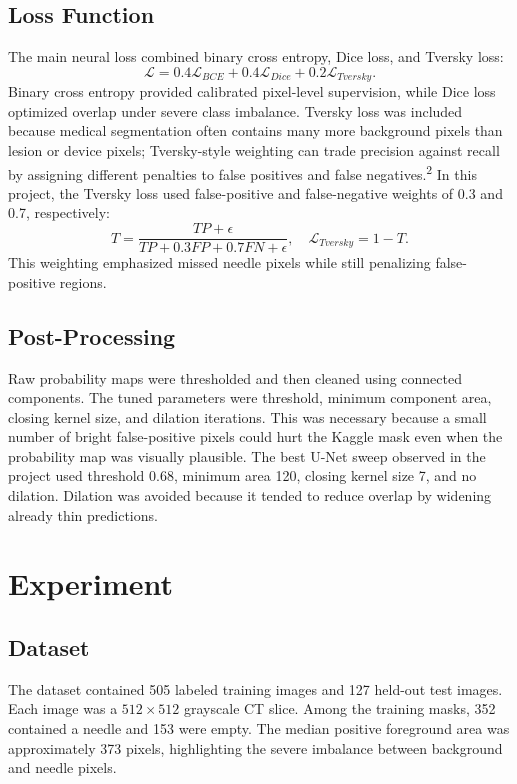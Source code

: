 \documentclass[10pt]{article}
\begin{document}
\subsection{Loss Function}
The main neural loss combined binary cross entropy, Dice loss, and Tversky loss:
\begin{equation}
\mathcal{L}=0.4\mathcal{L}_{BCE}+0.4\mathcal{L}_{Dice}+0.2\mathcal{L}_{Tversky}.
\end{equation}
Binary cross entropy provided calibrated pixel-level supervision, while Dice loss optimized overlap under severe class imbalance. Tversky loss was included because medical segmentation often contains many more background pixels than lesion or device pixels; Tversky-style weighting can trade precision against recall by assigning different penalties to false positives and false negatives.\textsuperscript{2} In this project, the Tversky loss used false-positive and false-negative weights of 0.3 and 0.7, respectively:
\begin{equation}
T = \frac{TP+\epsilon}{TP+0.3FP+0.7FN+\epsilon}, \quad
\mathcal{L}_{Tversky}=1-T.
\end{equation}
This weighting emphasized missed needle pixels while still penalizing false-positive regions.

\subsection{Post-Processing}
Raw probability maps were thresholded and then cleaned using connected components. The tuned parameters were threshold, minimum component area, closing kernel size, and dilation iterations. This was necessary because a small number of bright false-positive pixels could hurt the Kaggle mask even when the probability map was visually plausible. The best U-Net sweep observed in the project used threshold $0.68$, minimum area 120, closing kernel size 7, and no dilation. Dilation was avoided because it tended to reduce overlap by widening already thin predictions.

\section{Experiment}
\subsection{Dataset}
The dataset contained 505 labeled training images and 127 held-out test images. Each image was a $512 \times 512$ grayscale CT slice. Among the training masks, 352 contained a needle and 153 were empty. The median positive foreground area was approximately 373 pixels, highlighting the severe imbalance between background and needle pixels.
\end{document}
